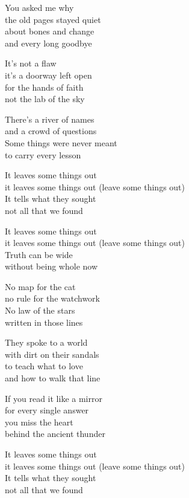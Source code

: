 \begin{lyrics}
You asked me why\\
the old pages stayed quiet\\
about bones and change\\
and every long goodbye

It’s not a flaw\\
it’s a doorway left open\\
for the hands of faith\\
not the lab of the sky

There’s a river of names\\
and a crowd of questions\\
Some things were never meant\\
to carry every lesson

It leaves some things out\\
it leaves some things out
(leave some things out)\\
It tells what they sought\\
not all that we found

It leaves some things out\\
it leaves some things out
(leave some things out)\\
Truth can be wide\\
without being whole now

No map for the cat\\
no rule for the watchwork\\
No law of the stars\\
written in those lines

They spoke to a world\\
with dirt on their sandals\\
to teach what to love\\
and how to walk that line

If you read it like a mirror\\
for every single answer\\
you miss the heart\\
behind the ancient thunder

It leaves some things out\\
it leaves some things out
(leave some things out)\\
It tells what they sought\\
not all that we found


\end{lyrics}

